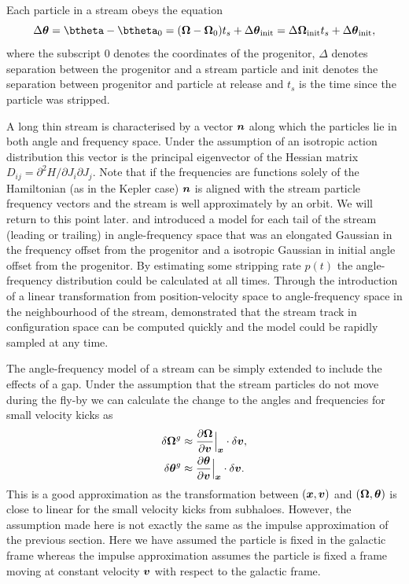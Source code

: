 \documentclass[useAMS,usenatbib,fleqn,a4paper]{mn2e}
\newcommand{\bs}[1]{\bmath{#1}}
\begin{document}
Each particle in a stream obeys the equation
\begin{equation}\label{linearevol}
\Delta\bs{\theta} = \btheta-\btheta_0 = (\boldsymbol{\Omega}-\boldsymbol{\Omega}_0)t_s +\Delta\bs{\theta}_\mathrm{init}= \Delta\bs{\Omega}_\mathrm{init}t_s+\Delta\bs{\theta}_\mathrm{init},
\end{equation}
where the subscript $0$ denotes the coordinates of the progenitor, $\Delta$ denotes separation between the progenitor and a stream particle and $\mathrm{init}$ denotes the separation between progenitor and particle at release and $t_s$ is the time since the particle was stripped.

A long thin stream is characterised by a vector $\bs{n}$ along which the particles lie in both angle and frequency space. Under the assumption of an isotropic action distribution this vector is the principal eigenvector of the Hessian matrix $D_{ij}=\partial^2 H/\partial J_i\partial J_j$. Note that if the frequencies are functions solely of the Hamiltonian (as in the Kepler case) $\bs{n}$ is aligned with the stream particle frequency vectors and the stream is well approximately by an orbit. We will return to this point later. \cite{Bovy2014} and \cite{Sanders2014} introduced a model for each tail of the stream (leading or trailing) in angle-frequency space that was an elongated Gaussian in the frequency offset from the progenitor and a isotropic Gaussian in initial angle offset from the progenitor. By estimating some stripping rate $p(t)$ the angle-frequency distribution could be calculated at all times. Through the introduction of a linear transformation from position-velocity space to angle-frequency space in the neighbourhood of the stream, \cite{Bovy2014} demonstrated that the stream track in configuration space can be computed quickly and the model could be rapidly sampled at any time.

The angle-frequency model of a stream can be simply extended to include the effects of a gap. Under the assumption that the stream particles do not move during the fly-by we can calculate the change to the angles and frequencies for small velocity kicks as
\begin{equation}\label{eq:kickfreqangle}
\begin{split}
\delta \boldsymbol{\Omega}^g &\approx \frac{\upartial \boldsymbol{\Omega}}{\upartial \bs{v}}\Big|_{\bs{x}}\cdot \delta\bs{v},\\
\delta \bs{\theta}^g &\approx \frac{\upartial \bs{\theta}}{\upartial \bs{v}}\Big|_{\bs{x}}\cdot \delta\bs{v}.
\end{split}
\end{equation}
This is a good approximation as the transformation between $(\bs{x},\bs{v})$ and $(\boldsymbol{\Omega},\bs{\theta})$ is close to linear for the small velocity kicks from subhaloes. However, the assumption made here is not exactly the same as the impulse approximation of the previous section. Here we have assumed the particle is fixed in the galactic frame whereas the impulse approximation assumes the particle is fixed a frame moving at constant velocity $\bs{v}$ with respect to the galactic frame.
\end{document}
